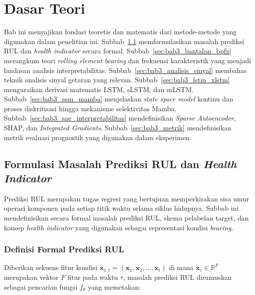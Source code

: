 ﻿%
\chapter{Dasar Teori}
\label{bab:dasar-teori}

Bab ini menyajikan fondasi teoretis dan matematis dari metode-metode yang
digunakan dalam penelitian ini. Subbab~\ref{sec:bab3_formulasi_rul} memformulasikan
masalah prediksi RUL dan \emph{health indicator} secara formal.
Subbab~\ref{sec:bab3_bantalan_bpfx} merangkum teori \emph{rolling element bearing} dan
frekuensi karakteristik yang menjadi landasan analisis interpretabilitas.
Subbab~\ref{sec:bab3_analisis_sinyal} membahas teknik analisis sinyal getaran
yang relevan. Subbab~\ref{sec:bab3_lstm_xlstm} menguraikan derivasi matematis
LSTM, sLSTM, dan mLSTM. Subbab~\ref{sec:bab3_ssm_mamba} menjelaskan
\emph{state space model} kontinu dan proses diskritisasi hingga mekanisme
selektivitas Mamba. Subbab~\ref{sec:bab3_sae_interpretabilitas} mendefinisikan
\emph{Sparse Autoencoder}, SHAP, dan \emph{Integrated Gradients}.
Subbab~\ref{sec:bab3_metrik} mendefinisikan metrik evaluasi prognostik
yang digunakan dalam eksperimen.

\section{Formulasi Masalah Prediksi RUL dan \emph{Health Indicator}}
\label{sec:bab3_formulasi_rul}

Prediksi RUL merupakan tugas regresi yang bertujuan memperkirakan sisa umur
operasi komponen pada setiap titik waktu selama siklus hidupnya.
Subbab ini mendefinisikan secara formal masalah prediksi RUL, skema pelabelan
target, dan konsep \emph{health indicator} yang digunakan sebagai representasi
kondisi \emph{bearing}.

\subsection{Definisi Formal Prediksi RUL}
\label{subsec:bab3_definisi_rul}

Diberikan sekuens fitur kondisi $\mathbf{x}_{1:t} = (\mathbf{x}_1, \mathbf{x}_2,
\ldots, \mathbf{x}_t)$ di mana $\mathbf{x}_\tau \in \mathbb{R}^F$ merupakan
vektor $F$ fitur pada waktu $\tau$, masalah prediksi RUL dirumuskan sebagai
pencarian fungsi $f_\theta$ yang memetakan:

